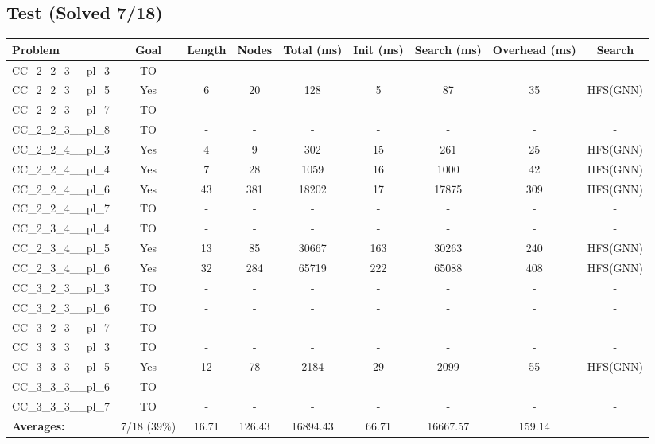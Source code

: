 \documentclass{article}
\begin{document}
\subsection*{Test (Solved 7/18)}
\begin{tabular}{lcccccccc}
\toprule
Problem & Goal & Length & Nodes & Total (ms) & Init (ms) & Search (ms) & Overhead (ms) & Search \\
\midrule
CC\_2\_2\_3\_\_pl\_3 & TO & - & - & - & - & - & - & - \\
CC\_2\_2\_3\_\_pl\_5 & Yes & 6 & 20 & 128 & 5 & 87 & 35 & HFS(GNN) \\
CC\_2\_2\_3\_\_pl\_7 & TO & - & - & - & - & - & - & - \\
CC\_2\_2\_3\_\_pl\_8 & TO & - & - & - & - & - & - & - \\
CC\_2\_2\_4\_\_pl\_3 & Yes & 4 & 9 & 302 & 15 & 261 & 25 & HFS(GNN) \\
CC\_2\_2\_4\_\_pl\_4 & Yes & 7 & 28 & 1059 & 16 & 1000 & 42 & HFS(GNN) \\
CC\_2\_2\_4\_\_pl\_6 & Yes & 43 & 381 & 18202 & 17 & 17875 & 309 & HFS(GNN) \\
CC\_2\_2\_4\_\_pl\_7 & TO & - & - & - & - & - & - & - \\
CC\_2\_3\_4\_\_pl\_4 & TO & - & - & - & - & - & - & - \\
CC\_2\_3\_4\_\_pl\_5 & Yes & 13 & 85 & 30667 & 163 & 30263 & 240 & HFS(GNN) \\
CC\_2\_3\_4\_\_pl\_6 & Yes & 32 & 284 & 65719 & 222 & 65088 & 408 & HFS(GNN) \\
CC\_3\_2\_3\_\_pl\_3 & TO & - & - & - & - & - & - & - \\
CC\_3\_2\_3\_\_pl\_6 & TO & - & - & - & - & - & - & - \\
CC\_3\_2\_3\_\_pl\_7 & TO & - & - & - & - & - & - & - \\
CC\_3\_3\_3\_\_pl\_3 & TO & - & - & - & - & - & - & - \\
CC\_3\_3\_3\_\_pl\_5 & Yes & 12 & 78 & 2184 & 29 & 2099 & 55 & HFS(GNN) \\
CC\_3\_3\_3\_\_pl\_6 & TO & - & - & - & - & - & - & - \\
CC\_3\_3\_3\_\_pl\_7 & TO & - & - & - & - & - & - & - \\
\textbf{Averages:} & 7/18 (39\%) & 16.71 & 126.43 & 16894.43 & 66.71 & 16667.57 & 159.14 & \\
\bottomrule
\end{tabular}
\\[0.7cm]
\end{document}
